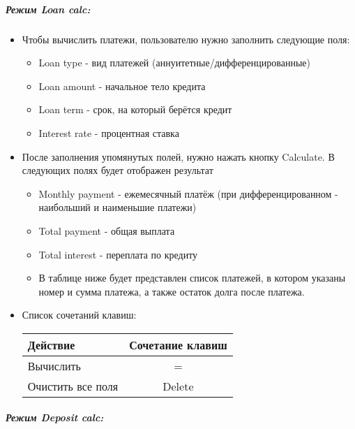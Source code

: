 \documentclass[
]{article}
\providecommand{\tightlist}{%
  \setlength{\itemsep}{0pt}\setlength{\parskip}{0pt}}
\begin{document}
\subparagraph{Режим Loan
calc:}\label{ux440ux435ux436ux438ux43c-loan-calc}

\begin{itemize}
\item
  Чтобы вычислить платежи, пользователю нужно заполнить следующие поля:

  \begin{itemize}
  \tightlist
  \item
    Loan type - вид платежей (аннуитетные/дифференцированные)
  \item
    Loan amount - начальное тело кредита
  \item
    Loan term - срок, на который берётся кредит
  \item
    Interest rate - процентная ставка
  \end{itemize}
\item
  После заполнения упомянутых полей, нужно нажать кнопку Calculate. В
  следующих полях будет отображен результат

  \begin{itemize}
  \tightlist
  \item
    Monthly payment - ежемесячный платёж (при дифференцированном -
    наибольший и наименьшие платежи)
  \item
    Total payment - общая выплата
  \item
    Total interest - переплата по кредиту
  \item
    В таблице ниже будет представлен список платежей, в котором указаны
    номер и сумма платежа, а также остаток долга после платежа.
  \end{itemize}
\item
  Список сочетаний клавиш:

  \begin{longtable}[]{@{}lc@{}}
  \toprule\noalign{}
  Действие & Сочетание клавиш \\
  \midrule\noalign{}
  \endhead
  \bottomrule\noalign{}
  \endlastfoot
  Вычислить & = \\
  Очистить все поля & Delete \\
  \end{longtable}
\end{itemize}

\subparagraph{Режим Deposit
calc:}\label{ux440ux435ux436ux438ux43c-deposit-calc}
\end{document}
